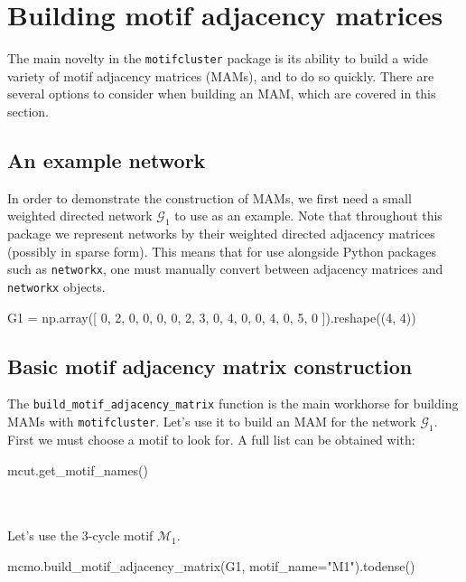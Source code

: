 \documentclass{article}
\begin{document}
\section{Building motif adjacency matrices}

The main novelty in the \texttt{motifcluster} package is its ability to
build a wide variety of motif adjacency matrices (MAMs), and to do so quickly.
There are several options to consider when building an MAM,
which are covered in this section.

\subsection{An example network}

In order to demonstrate the construction of MAMs,
we first need a small weighted directed network
$\mathcal{G}_1$ to use as an example.
Note that throughout this package we represent networks by their
weighted directed adjacency matrices (possibly in sparse form).
This means that for use alongside Python packages such as \texttt{networkx},
one must manually convert between adjacency matrices and
\texttt{networkx} objects.

\begin{pyconsole}
G1 = np.array([
  0, 2, 0, 0,
  0, 0, 2, 3,
  0, 4, 0, 0,
  4, 0, 5, 0
]).reshape((4, 4))
\end{pyconsole}

\subsection{Basic motif adjacency matrix construction}

The \texttt{build\_motif\_adjacency\_matrix} function is the main workhorse
for building MAMs with \texttt{motifcluster}.
Let's use it to build an MAM for the network $\mathcal{G}_1$.
First we must choose a motif to look for.
A full list can be obtained with:

\begin{pyverbatim}
mcut.get_motif_names()
\end{pyverbatim}
%
\vspace*{-3mm}
 \\
 \\

Let's use the 3-cycle motif $\mathcal{M}_1$.

\begin{pyconsole}
mcmo.build_motif_adjacency_matrix(G1, motif_name="M1").todense()
\end{pyconsole}
\end{document}
